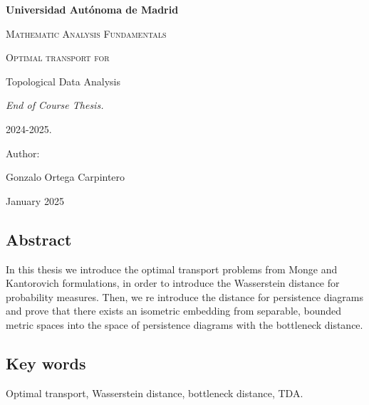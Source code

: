\documentclass[12pt, a4paper]{article}
\theoremstyle{definition}
\newcommand{\authorname}{Gonzalo Ortega Carpintero}
\newcommand{\institution}{Universidad Autónoma de Madrid}
\newcommand{\projecttitle}{Optimal transport for

Topological Data Analysis}
\begin{document}
\begin{titlepage}
    \centering
    \vspace{1cm}
    {\bfseries\LARGE \institution \par}
    \vspace{1cm}
    {\scshape\Large Mathematic Analysis Fundamentals \par}
    \vspace{3cm}
    {\scshape\Huge \projecttitle \par}
    \vspace{3cm}
    {\itshape\Large End of Course Thesis.
    
    2024-2025. \par}
    \vfill
    {\Large Author: \par}
    {\Large \authorname \par}
    \vfill
    {\Large January 2025 \par}
\end{titlepage}


\setlength{\parskip}{0.75em}
\renewcommand{\baselinestretch}{1.25}


\subsection*{Abstract}
In this thesis we introduce the optimal transport problems from Monge and Kantorovich formulations, in order to introduce the Wasserstein distance for probability measures. Then, we re introduce the distance for persistence diagrams and prove that there exists an isometric embedding from separable, bounded metric spaces into the space of persistence diagrams with the bottleneck distance.

\subsection*{Key words}
Optimal transport, Wasserstein distance, bottleneck distance, TDA.

\tableofcontents
\pagebreak


\pagebreak


\pagebreak


\pagebreak



\end{document}
